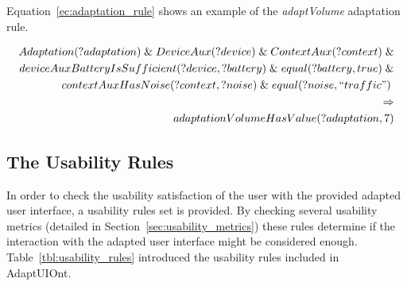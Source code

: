 Equation~\ref{ec:adaptation_rule} shows an example of the \textit{adaptVolume} 
adaptation rule.

\footnotesize
\begin{equation} \label{ec:adaptation_rule}
  \begin{align*} 
  Adaptation(?adaptation)\; \&\; DeviceAux(?device)\; \&\; ContextAux(?context)\; \& \\
  deviceAuxBatteryIsSufficient(?device, ?battery)\; \&\; equal(?battery, true)\; \& \\
  contextAuxHasNoise(?context, ?noise)\; \&\; equal(?noise, ``traffic")\;\\ 
  \Rightarrow \\
  adaptationVolumeHasValue(?adaptation, 7)\\
  \end{align*}
\end{equation}
\normalsize


\subsection{The Usability Rules}
In order to check the usability satisfaction of the user with the provided
adapted user interface, a usability rules set is provided. By checking several
usability metrics (detailed in Section~\ref{sec:usability_metrics}) these rules
determine if the interaction with the adapted user interface might be considered
enough. Table~\ref{tbl:usability_rules} introduced the usability rules included
in AdaptUIOnt.

